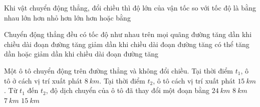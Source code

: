 \begin{ex}%
Khi vật chuyển động thẳng, đổi chiều thì độ lớn của vận tốc so với tốc độ là
\choice
{bằng nhau}
{lớn hơn}
{\True nhỏ hơn}
{lớn hơn hoặc bằng}
\loigiai{

}
 \end{ex}
\begin{ex}%
Chuyển động thẳng đều có tốc độ
\choice
{\True như nhau trên mọi quãng đường}
{tăng dần khi chiều dài đoạn đường tăng}
{giảm dần khi chiều dài đoạn đường tăng}
{có thể tăng dần hoặc giảm dần khi chiều dài đoạn đường tăng}
\loigiai{
}
 \end{ex}
\begin{ex}%
Một ô tô chuyển động trên đường thẳng và không đổi chiều. Tại thời điểm $t_1$, ô tô ở cách vị trí xuất phát $8\ km$. Tại thời điểm $t_2$, ô tô cách vị trí xuất phát $15\ km$. Từ $t_1$ đến $t_2$, độ dịch chuyển của ô tô đã thay đổi một đoạn bằng
\choice
{$24\ km$}
{$8\ km$}
{\True $7\ km$}
{$15\ km$}
\loigiai{

}
\end{ex}

